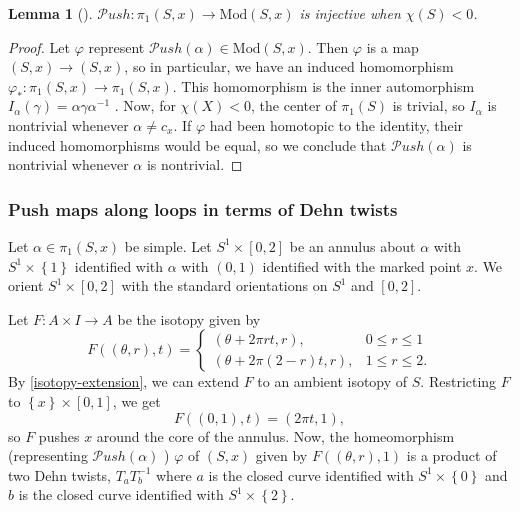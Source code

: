 \documentclass[reqno]{amsart}
\newtheorem{lemma}[theorem]{Lemma}
\theoremstyle{definition}
\theoremstyle{remark}
\newcommand{\Mod}{{\mathrm{Mod}}}
\newcommand{\Push}{{\mathcal{P}}ush}
\begin{document}
 \begin{lemma}[]
     $\Push \colon \pi_1 \left( S,x \right) 
     \to \Mod (S,x)$ is injective when
     $\chi (S) <0$.
 \end{lemma}

 \begin{proof}
     Let $\varphi $ represent 
     $\Push \left( \alpha \right) \in 
     \Mod \left( S,x \right) $. Then
     $\varphi $ is a map
     $\left( S,x \right) \to \left( S,x \right) $, so
     in particular, we have an induced homomorphism
     $\varphi_* \colon \pi_1 \left( S,x \right) 
     \to \pi_1 \left( S,x \right) $.
     This homomorphism is the inner automorphism
     $I_{\alpha} (\gamma) = \alpha \gamma \alpha^{-1}$ .
     Now, for $\chi (X) < 0$, the center of $\pi_1 (S)$ is
     trivial, so $I_{\alpha}$ is nontrivial whenever
     $\alpha \neq c_{x}$. If $\varphi $ had been
     homotopic to the identity, their
     induced homomorphisms would be equal, so we conclude
     that $\Push \left( \alpha \right) $ is nontrivial whenever
     $\alpha$ is nontrivial.
 \end{proof}

 \subsubsection{Push maps along loops in terms of Dehn twists}

 Let $\alpha \in \pi_1 \left( S,x \right) $ be simple.
 Let $S^{1} \times \left[ 0,2 \right] $ be an annulus
 about $\alpha$ with $S^{1} \times \left\{ 1 \right\} $ 
 identified with $\alpha$ with
 $(0,1)$ identified with the marked point
 $x$. We orient 
 $S^{1} \times \left[ 0,2 \right] $ with the
 standard orientations on
 $S^{1}$ and $\left[ 0,2 \right] $. 

 Let $F \colon A \times I \to A$ be the
 isotopy given by
 \[
 F \left( \left( \theta,r \right) ,t \right) 
 = 
 \begin{cases}
     \left( \theta + 2\pi r t, r \right) ,& 0 \le r \le 1\\
     \left( \theta + 2 \pi (2-r)t,r \right) ,& 1 \le r \le 2.
 \end{cases}
 \]
 By \ref{isotopy-extension}, we can extend
 $F$ to an ambient isotopy of $S$. Restricting
 $F$ to $\left\{ x \right\} \times \left[ 0,1 \right] $, we
 get
 \[
 F\left( (0,1),t \right) = \left( 2 \pi t,1 \right),
 \] 
 so $F$ pushes $x$ around the core of the annulus.
 Now, the homeomorphism (representing $\Push\left( \alpha \right) $ )
 $\varphi $ of $\left( S,x \right) $ given by
 $F\left( (\theta, r),1 \right) $ is a product
 of two Dehn twists,  $T_a T_{b}^{-1}$ where
 $a$ is the closed curve identified with
 $S^{1} \times \left\{ 0 \right\} $ and
 $b$ is the closed curve identified with
 $S^{1} \times \left\{ 2 \right\} $.
\end{document}
